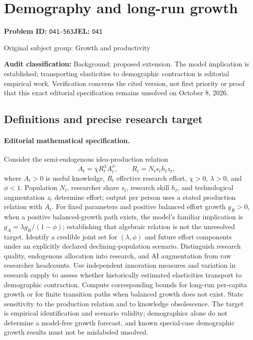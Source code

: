 \documentclass[11pt,a4paper]{article}
\begin{document}
\section*{Demography and long-run growth}
\textbf{Problem ID:} \texttt{O41-563}\quad \textbf{JEL:} \texttt{O41}\par
\label{problem:OP-0269}
{\sffamily\small\color{muted}Original subject group: Growth and productivity\par}
\label{definitions:problem:30007550}
\textbf{Audit classification:} Background; proposed extension. The model implication is established; transporting elasticities to demographic contraction is editorial empirical work. Verification concerns the cited version, not first priority or proof that this exact editorial specification remains unsolved on October 8, 2026.
\subsection*{Definitions and precise research target}
\paragraph{Editorial mathematical specification.} Consider the semi-endogenous idea-production relation
\[
\dot A_t=\chi R_t^\lambda A_t^\phi,\qquad
R_t=N_t s_t h_t z_t,
\]
where \(A_t>0\) is useful knowledge, \(R_t\) effective research effort, \(\chi>0\), \(\lambda>0\), and \(\phi<1\). Population \(N_t\), researcher share \(s_t\), research skill \(h_t\), and technological augmentation \(z_t\) determine effort; output per person uses a stated production relation with \(A_t\). For fixed parameters and positive balanced effort growth \(g_R>0\), when a positive balanced-growth path exists, the model’s familiar implication is \(g_A=\lambda g_R/(1-\phi)\); establishing that algebraic relation is not the unresolved target.
Identify a credible joint set for \((\lambda,\phi)\) and future effort components under an explicitly declared declining-population scenario. Distinguish research quality, endogenous allocation into research, and AI augmentation from raw researcher headcounts. Use independent innovation measures and variation in research supply to assess whether historically estimated elasticities transport to demographic contraction. Compute corresponding bounds for long-run per-capita growth or for finite transition paths when balanced growth does not exist. State sensitivity to the production relation and to knowledge obsolescence. The target is empirical identification and scenario validity; demographics alone do not determine a model-free growth forecast, and known special-case demographic growth results must not be mislabeled unsolved.
\end{document}
